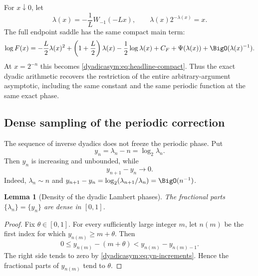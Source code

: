 \documentclass[11pt,oneside]{article}
\newtheorem{lemma}[lemma]{Lemma}
\theoremstyle{definition}
\theoremstyle{remark}
\begin{document}
For $x\downarrow0$, let
\begin{equation}
 \lambda(x)=-\frac1L W_{-1}(-Lx),
 \qquad
 \lambda(x)2^{-\lambda(x)}=x.                              \label{dyadicasym:eq:lambda-x}
\end{equation}
The full endpoint saddle has the same compact main term:
\begin{equation}
 \log F(x)=
 -\frac L2\lambda(x)^2+
 \left(1+\frac L2\right)\lambda(x)-\frac12\log\lambda(x)
 +C_F+\Psi(\lambda(x))+\BigO(\lambda(x)^{-1}).              \label{dyadicasym:eq:general-x-main}
\end{equation}
At $x=2^{-n}$ this becomes \eqref{dyadicasym:eq:headline-compact}.  Thus the exact dyadic arithmetic
recovers the restriction of the entire arbitrary-argument asymptotic, including the same
constant and the same periodic function at the same exact phase.

\subsection{Dense sampling of the periodic correction}

The sequence of inverse dyadics does not freeze the periodic phase.  Put
\begin{equation}
 y_n=\lambda_n-n=\log_2\lambda_n.                           \label{dyadicasym:eq:yn}
\end{equation}
Then $y_n$ is increasing and unbounded, while
\begin{equation}
 y_{n+1}-y_n\longrightarrow0.                               \label{dyadicasym:eq:yn-increments}
\end{equation}
Indeed, $\lambda_n\sim n$ and
$y_{n+1}-y_n=\log_2(\lambda_{n+1}/\lambda_n)=\BigO(n^{-1})$.

\begin{lemma}[Density of the dyadic Lambert phases]
\label{dyadicasym:lem:phase-density}
The fractional parts $\{\lambda_n\}=\{y_n\}$ are dense in $[0,1]$.
\end{lemma}

\begin{proof}
Fix $\theta\in[0,1]$.  For every sufficiently large integer $m$, let $n(m)$ be the first
index for which $y_{n(m)}\ge m+\theta$.  Then
\begin{equation*}
 0\le y_{n(m)}-(m+\theta)
 <y_{n(m)}-y_{n(m)-1}.
\end{equation*}
The right side tends to zero by \eqref{dyadicasym:eq:yn-increments}.  Hence the fractional parts of
$y_{n(m)}$ tend to $\theta$.
\end{proof}
\end{document}
